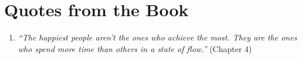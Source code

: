\section*{Quotes from the Book}
\begin{enumerate}
    \item \emph{``The happiest people aren’t the ones who achieve the most. They are the ones who spend more time than others in a state of flow.''} (Chapter 4)
\end{enumerate}